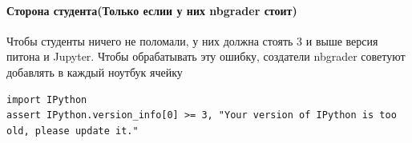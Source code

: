 \documentclass[a4paper,12pt]{article}
\begin{document}
\paragraph{Сторона студента(Только еслии у них nbgrader стоит)}
Чтобы студенты ничего не поломали, у них должна стоять 3 и выше версия питона и Jupyter.
Чтобы обрабатывать эту ошибку, создатели nbgrader советуют добавлять в каждый ноутбук ячейку
\begin{verbatim} 
import IPython
assert IPython.version_info[0] >= 3, "Your version of IPython is too old, please update it."
\end{verbatim} 
\end{document}
